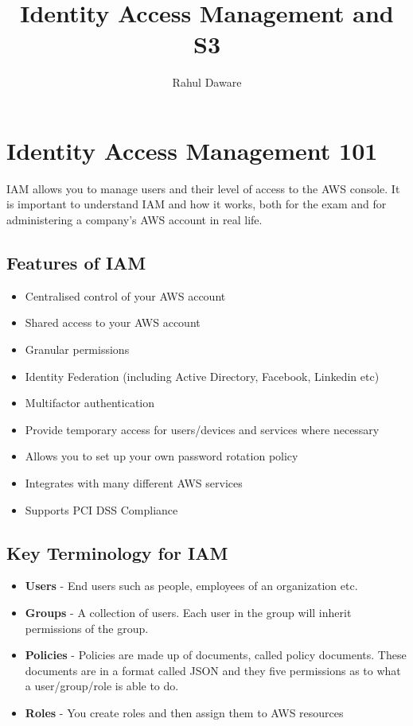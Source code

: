 \documentclass{article}
\author{Rahul Daware}
\begin{document}
\title{Identity Access Management and S3}
\maketitle
\newpage
\tableofcontents
\newpage

\section{Identity Access Management 101}

IAM allows you to manage users and their level of access to the AWS console. It is important to understand IAM and how it works, both for the exam and for administering a company's AWS account in real life.

\subsection{Features of IAM}
\begin{itemize}
\item
Centralised control of your AWS account

\item
Shared access to your AWS account

\item
Granular permissions

\item
Identity Federation (including Active Directory, Facebook, Linkedin etc)

\item
Multifactor authentication

\item
Provide temporary access for users/devices and services where necessary

\item
Allows you to set up your own password rotation policy

\item
Integrates with many different AWS services

\item
Supports PCI DSS Compliance
\end{itemize}

\subsection{Key Terminology for IAM}
\begin{itemize}
\item
\textbf{Users} - End users such as people, employees of an organization etc.

\item
\textbf{Groups} - A collection of users. Each user in the group will inherit permissions of the group.

\item
\textbf{Policies} - Policies are made up of documents, called policy documents. These documents are in a format called JSON and they five permissions as to what a user/group/role is able to do.

\item
\textbf{Roles} - You create roles and then assign them to AWS resources
\end{itemize}
\end{document}
